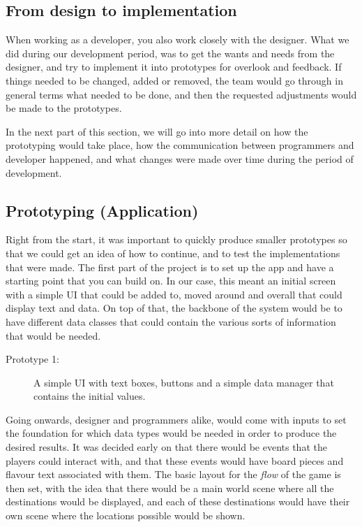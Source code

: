 \subsection{From design to implementation}
When working as a developer, you also work closely with the designer. What we did during our development period, was to get the wants and needs from the designer, and try to implement it into prototypes for overlook and feedback. 
If things needed to be changed, added or removed, the team would go through in general terms what needed to be done, and then the requested adjustments would be made to the prototypes.

In the next part of this section, we will go into more detail on how the prototyping would take place, how the communication between programmers and developer happened, and what changes were made over time during the period of development.

\subsection{Prototyping (Application)}
Right from the start, it was important to quickly produce smaller prototypes so that we could get an idea of how to continue, and to test the implementations that were made. The first part of the project is to set up the app and have a starting point that you can build on. In our case, this meant an initial screen with a simple UI that could be added to, moved around and overall that could display text and data. On top of that, the backbone of the system would be to have different data classes that could contain the various sorts of information that would be needed.

\begin{description}
\item[Prototype 1:] A simple UI with text boxes, buttons and a simple data manager that contains the initial values.
\end{description}

Going onwards, designer and programmers alike, would come with inputs to set the foundation for which data types would be needed in order to produce the desired results.
It was decided early on that there would be events that the players could interact with, and that these events would have board pieces and flavour text associated with them. The basic layout for the \textit{flow} of the game is then set, with the idea that there would be a main world scene where all the destinations would be displayed, and each of these destinations would have their own scene where the locations possible would be shown.

